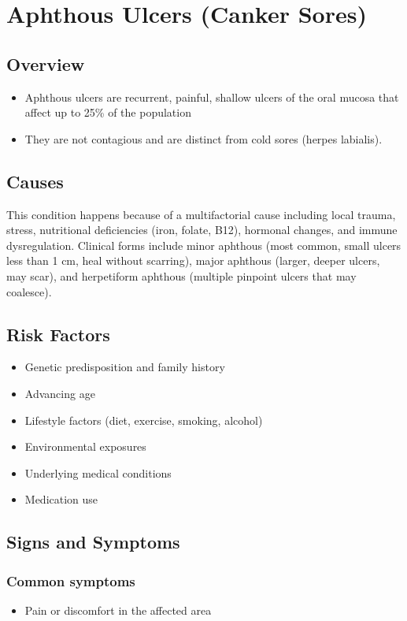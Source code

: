 \chapter{Aphthous Ulcers (Canker Sores)}
\label{sec:Aphthous Ulcers (Canker Sores)}

\section{Overview}


\begin{itemize}[noitemsep]
  \item Aphthous ulcers are recurrent, painful, shallow ulcers of the oral mucosa that affect up to 25\% of the population
  \item They are not contagious and are distinct from cold sores (herpes labialis).
\end{itemize}
\section{Causes}
This condition happens because of a multifactorial cause including local trauma, stress, nutritional deficiencies (iron, folate, B12), hormonal changes, and immune dysregulation. Clinical forms include minor aphthous (most common, small ulcers less than 1 cm, heal without scarring), major aphthous (larger, deeper ulcers, may scar), and herpetiform aphthous (multiple pinpoint ulcers that may coalesce).     
\section{Risk Factors}

\begin{itemize}[noitemsep]
  \item Genetic predisposition and family history
  \item Advancing age
  \item Lifestyle factors (diet, exercise, smoking, alcohol)
  \item Environmental exposures
  \item Underlying medical conditions
  \item Medication use
\end{itemize}
\section{Signs and Symptoms}

\subsection{Common symptoms}
\begin{itemize}[noitemsep]
  \item Pain or discomfort in the affected area
  \end{itemize}

